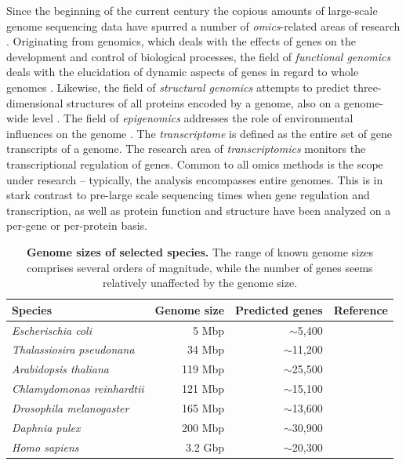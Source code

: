 Since the beginning of the current century the copious amounts of large-scale 
genome sequencing data have spurred a number of {\em omics}-related areas of 
research \citep{Sauer2007, Colquhoun2005}.
Originating from genomics, which deals with the effects of genes on the 
development and control of biological processes, the field of {\em functional
genomics} deals with the elucidation of dynamic aspects of genes in regard
to whole genomes \citep{Hieter1997}.
Likewise, the field of {\em structural genomics} attempts to predict 
three-dimensional structures of all proteins encoded by a genome, also on
a genome-wide level \citep{Baker2001a}.
The field of {\em epigenomics} addresses the role of environmental influences
on the genome \citep{Jirtle2007}.
The {\em transcriptome} is defined as the entire set of gene transcripts of a 
genome.
The research area of {\em transcriptomics} monitors the transcriptional 
regulation of genes.
Common to all omics methods is the scope under research -- typically, the 
analysis encompasses entire genomes.
This is in stark contrast to pre-large scale sequencing times when gene 
regulation and transcription, as well as protein function and structure have 
been analyzed on a per-gene or per-protein basis.

\begin{table}
\begin{tabular}{|l|r|r|l|}
\hline
Species & Genome size & Predicted genes & Reference \\
\hline
{\em Escherischia coli} & 5 Mbp & $\sim$5,400 & \cite{Welch2002} \\
{\em Thalassiosira pseudonana} & 34 Mbp & $\sim$11,200 & \cite{Armbrust2004} \\
{\em Arabidopsis thaliana} & 119 Mbp & $\sim$25,500 & \cite{Arabidopsis2000} \\
{\em Chlamydomonas reinhardtii} & 121 Mbp & $\sim$15,100 & \cite{Merchant2007} \\
{\em Drosophila melanogaster} & 165 Mbp & $\sim$13,600 & \cite{Adams2000} \\
{\em Daphnia pulex} & 200 Mbp & $\sim$30,900 & \cite{Colbourne2011} \\
{\em Homo sapiens} & 3.2 Gbp & $\sim$20,300 & \cite{Venter2001} \\
\hline
\end{tabular}
\caption{{\bf Genome sizes of selected species.} The range of known genome sizes 
    comprises several orders of magnitude, while the number of genes seems
    relatively unaffected by the genome size.
}
\label{tab:genome-sizes}
\end{table}



